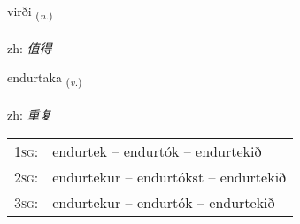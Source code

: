 \documentclass[frontgrid, backgrid]{flacards}\usepackage[]{graphicx}\usepackage[]{color}
\begin{document}
\renewcommand{\flhead}{\vskip5pt \fboxsep=0pt {\small\bfseries\footnotesize Nafnorð | 名词}}
\renewcommand{\fcfoot}{\vskip5pt \fboxsep=0pt \hspace{2pt}{\small\bfseries\footnotesize 2K}}

\renewcommand{\blhead}{\vskip5pt {\small\bfseries\footnotesize Nafnorð | 名词 }}
\renewcommand{\bcfoot}{\vskip5pt \hspace{2pt}{\small\bfseries\footnotesize 2K}}


{virði \small{\textsubscript{(\textit{n.})}} \\[1ex] %
\textphonetic{[vɪrðɪ]} \\
zh: \emph{值得} \\  [2ex]
\renewcommand*{\arraystretch}{0.8}
}

\renewcommand{\flhead}{\vskip5pt \fboxsep=0pt {\small\bfseries\footnotesize Sagnorð | 动词}}
\renewcommand{\fcfoot}{\vskip5pt \fboxsep=0pt \hspace{2pt}{\small\bfseries\footnotesize 2K}}

\renewcommand{\blhead}{\vskip5pt {\small\bfseries\footnotesize Sagnorð | 动词 }}
\renewcommand{\bcfoot}{\vskip5pt \hspace{2pt}{\small\bfseries\footnotesize 2K}}


{endurtaka \small{\textsubscript{(\textit{v.})}} \\[1ex] %
 \\
zh: \emph{重复} \\  [2ex]
\renewcommand*{\arraystretch}{0.8}
\begin{tabular}{p{1cm}l}
\textsc{1sg}: & endurtek -- endurtók -- endurtekið \\ 
\textsc{2sg}: & endurtekur -- endurtókst -- endurtekið \\ 
\textsc{3sg}: & endurtekur -- endurtók -- endurtekið \\ 
\end{tabular}
}
\end{document}
